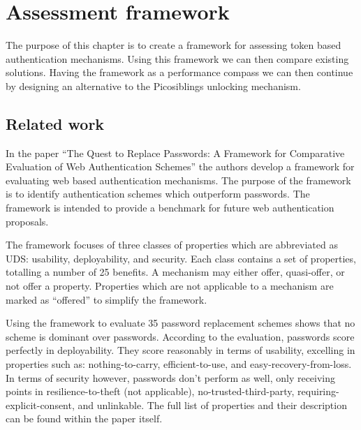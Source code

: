 
\chapter{Assessment framework}

\label{Chapter3}


The purpose of this chapter is to create a framework for assessing token based authentication mechanisms. Using this framework we can then compare existing solutions. Having the framework as a performance compass we can then continue by designing an alternative to the Picosiblings unlocking mechanism.

\section{Related work}

In the paper ``The Quest to Replace Passwords: A Framework for Comparative Evaluation of Web Authentication Schemes'' \cite{bonneau2012quest} the authors develop a framework for evaluating web based authentication mechanisms. The purpose of the framework is to identify authentication schemes which outperform passwords. The framework is intended to provide a benchmark for future web authentication proposals.

The framework focuses of three classes of properties which are abbreviated as UDS: usability, deployability, and security. Each class contains a set of properties, totalling a number of 25 benefits. A mechanism may either offer, quasi-offer, or not offer a property. Properties which are not applicable to a mechanism are marked as ``offered'' to simplify the framework.

Using the framework to evaluate 35 password replacement schemes shows that no scheme is dominant over passwords. According to the evaluation, passwords score perfectly in deployability. They score reasonably in terms of usability, excelling in properties such as: nothing-to-carry, efficient-to-use, and easy-recovery-from-loss. In terms of security however, passwords don't perform as well, only receiving points in resilience-to-theft (not applicable), no-trusted-third-party, requiring-explicit-consent, and unlinkable. The full list of properties and their description can be found within the paper itself.

